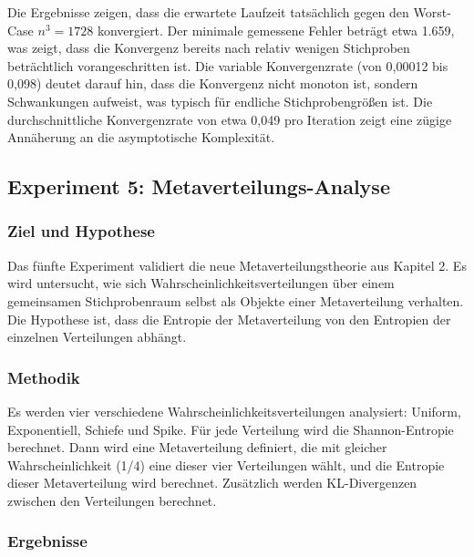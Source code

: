 ﻿\documentclass[a4paper,12pt]{article}
\theoremstyle{definition}
\begin{document}
Die Ergebnisse zeigen, dass die erwartete Laufzeit tatsächlich gegen den Worst-Case $n^3 = 1728$ konvergiert. Der minimale gemessene Fehler beträgt etwa 1.659, was zeigt, dass die Konvergenz bereits nach relativ wenigen Stichproben beträchtlich vorangeschritten ist. Die variable Konvergenzrate (von 0,00012 bis 0,098) deutet darauf hin, dass die Konvergenz nicht monoton ist, sondern Schwankungen aufweist, was typisch für endliche Stichprobengrößen ist. Die durchschnittliche Konvergenzrate von etwa 0,049 pro Iteration zeigt eine zügige Annäherung an die asymptotische Komplexität.


\subsection{Experiment 5: Metaverteilungs-Analyse}
\label{exp:metadist}

\subsubsection{Ziel und Hypothese}

Das fünfte Experiment validiert die neue Metaverteilungstheorie aus Kapitel 2. Es wird untersucht, wie sich Wahrscheinlichkeitsverteilungen über einem gemeinsamen Stichprobenraum selbst als Objekte einer Metaverteilung verhalten. Die Hypothese ist, dass die Entropie der Metaverteilung von den Entropien der einzelnen Verteilungen abhängt.

\subsubsection{Methodik}

Es werden vier verschiedene Wahrscheinlichkeitsverteilungen analysiert: Uniform, Exponentiell, Schiefe und Spike. Für jede Verteilung wird die Shannon-Entropie berechnet. Dann wird eine Metaverteilung definiert, die mit gleicher Wahrscheinlichkeit (1/4) eine dieser vier Verteilungen wählt, und die Entropie dieser Metaverteilung wird berechnet. Zusätzlich werden KL-Divergenzen zwischen den Verteilungen berechnet.

\subsubsection{Ergebnisse}
\end{document}
